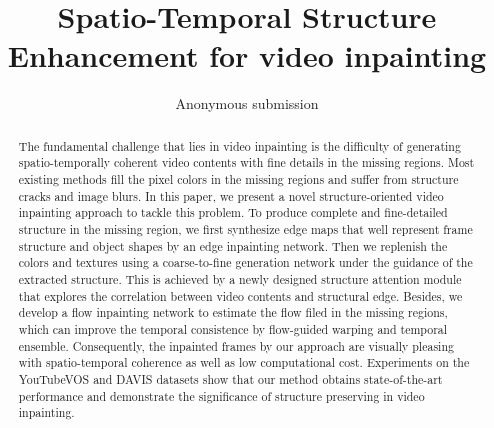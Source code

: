 \documentclass[letterpaper]{article} %
\title{Spatio-Temporal Structure Enhancement for video inpainting}
\author{Anonymous submission}
\begin{document}
\maketitle

\begin{abstract}
The fundamental challenge that lies in video inpainting is the difficulty of generating spatio-temporally coherent video contents with fine details in the missing regions. Most existing methods fill the pixel colors in the missing regions and suffer from structure cracks and image blurs. In this paper, we present a novel structure-oriented video inpainting approach to tackle this problem. To produce complete and fine-detailed structure in the missing region, we first synthesize edge maps that well represent frame structure and object shapes by an edge inpainting network. Then we replenish the colors and textures using a coarse-to-fine generation network under the guidance of the extracted structure. This is achieved by a newly designed structure attention module that explores the correlation between video contents and structural edge. Besides, we develop a flow inpainting network to estimate the flow filed in the missing regions, which can improve the temporal consistence by flow-guided warping and temporal ensemble. Consequently, the inpainted frames by our approach are visually pleasing with spatio-temporal coherence as well as low computational cost. Experiments on the YouTubeVOS and DAVIS datasets show that our method obtains state-of-the-art performance and demonstrate the significance of structure preserving in video inpainting.
	
\end{abstract}


 












 

 
\end{document}
